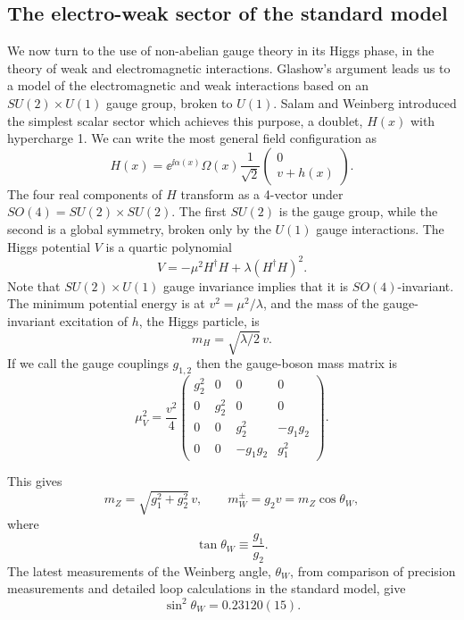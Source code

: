 \subsection{The electro-weak sector of the standard model}

We now turn to the use of non-abelian gauge theory in its Higgs phase, in the
theory of weak and electromagnetic interactions. Glashow's argument leads us
to a model of the electromagnetic and weak interactions based on an
$SU(2)\times U(1)$ gauge group, broken to $U(1)$. Salam and Weinberg
introduced the simplest scalar sector which achieves this purpose, a doublet,
$H(x)$ with hypercharge 1. We can write the most general field configuration as
\begin{equation*}
  H(x)=\ee^{\ii\alpha(x)}\Omega(x)\frac{1}{\sqrt{2}}
  \begin{pmatrix}0\\ v+h(x)\end{pmatrix}.
\end{equation*}
The four real components of $H$ transform as a 4-vector under
$SO(4)=SU(2)\times SU(2)$. The first $SU(2)$ is the gauge group, while the
second is a global symmetry, broken only by the $U(1)$ gauge interactions. The
Higgs potential $V$ is a quartic polynomial
\begin{equation*}
  V=-\mu^2 H^\dagger H+\lambda(H^\dagger H)^2.
\end{equation*}
Note that $SU(2)\times U(1)$ gauge invariance implies that it is
$SO(4)$-invariant. The minimum potential energy is at
$v^2=\mu^2/\lambda$, and the mass of the gauge-invariant excitation of $h$,
the Higgs particle, is
\begin{equation*}
  m_H=\sqrt{\lambda/2}\,v.
\end{equation*}
If we call the gauge couplings $g_{1,2}$ then the gauge-boson mass matrix is
\begin{equation*}
  \mu_V^2=\frac{v^2}{4}
  \begin{pmatrix}
    g_2^2&0&0&0\\
    0&g_2^2&0&0\\
    0&0&g_2^2&-g_1g_2\\
    0&0&-g_1g_2&g_1^2
  \end{pmatrix}.
\end{equation*}

This gives
\begin{equation*}
  m_Z=\sqrt{g_1^2+g_2^2}\,v,
  \qquad m_W^\pm=g_2v=m_Z\cos\theta_W,
\end{equation*}
where
\begin{equation*}
  \tan\theta_W\equiv\frac{g_1}{g_2}.
\end{equation*}
The latest measurements of the Weinberg angle, $\theta_W$, from comparison of
precision measurements and detailed loop calculations in the standard model,
give
\begin{equation*}
  \sin^2\theta_W=0.23120(15).
\end{equation*}

